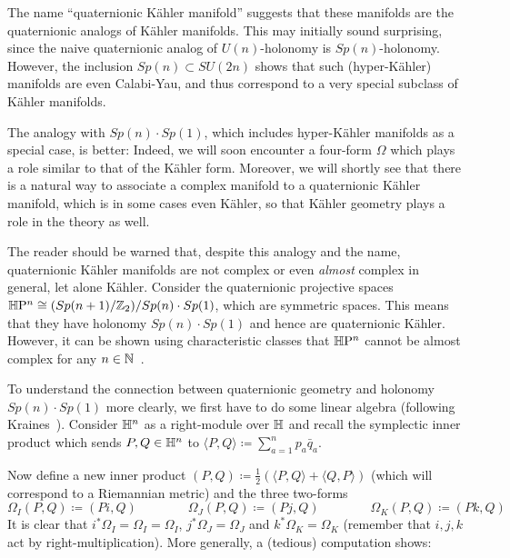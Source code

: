 \begin{rem}\leavevmode
	\begin{numberedlist}
		\item The name ``quaternionic K\"ahler manifold'' suggests that these manifolds are the quaternionic analogs of K\"ahler manifolds. This may initially sound surprising, since the naive quaternionic analog of $U(n)$-holonomy is $Sp(n)$-holonomy. However, the inclusion $Sp(n)\subset SU(2n)$ shows that such (hyper-K\"ahler) manifolds  are even Calabi-Yau, and thus correspond to a very special subclass of K\"ahler manifolds.
		
		The analogy with $Sp(n)\cdot Sp(1)$, which includes hyper-K\"ahler manifolds as a special case, is better: Indeed, we will soon encounter a four-form $\Omega$ which plays a role similar to that of the K\"ahler form. Moreover, we will shortly see that there is a natural way to associate a complex manifold to a quaternionic K\"ahler manifold, which is in some cases even K\"ahler, so that K\"ahler geometry plays a role in the theory as well.
		\item The reader should be warned that, despite this analogy and the name, quaternionic K\"ahler manifolds are not complex or even \emph{almost} complex in general, let alone K\"ahler. Consider the quaternionic projective spaces $\mathbb{H}\mathrm{P}^n\cong (Sp(n+1)/\mathbb{Z}_2)/Sp(n)\cdot Sp(1)$, which are symmetric spaces. This means that they have holonomy $Sp(n)\cdot Sp(1)$ and hence are quaternionic K\"ahler. However, it can be shown using characteristic classes that $\mathbb{H}\mathrm{P}^n$ cannot be almost complex for any $n\in\mathbb{N}$~\cite{Hir1960,Mas1962}.
	\end{numberedlist}
\end{rem}

To understand the connection between quaternionic geometry and holonomy $Sp(n)\cdot Sp(1)$ more clearly, we first have to do some linear algebra (following Kraines~\cite{Kra1966}). Consider $\mathbb{H}^n$ as a right-module over $\mathbb{H}$ and recall the symplectic inner product which sends $P, Q\in \mathbb{H}^n$ to $\langle P,Q\rangle \coloneqq \sum_{a=1}^n p_a \bar q_a$. 

Now define a new inner product $(P,Q)\coloneqq \frac{1}{2}(\langle P,Q\rangle +\langle Q,P\rangle )$ (which will correspond to a Riemannian metric) and the three two-forms 
\begin{equation*}
	\Omega_I(P,Q)\coloneqq (P i,Q) \qquad \qquad 
	\Omega_J(P,Q)\coloneqq (P j,Q) \qquad \qquad 
	\Omega_K(P,Q)\coloneqq (P k,Q)
\end{equation*}
It is clear that $i^*\Omega_I=\Omega_I=\Omega_I$, $j^*\Omega_J=\Omega_J$ and $k^*\Omega_K=\Omega_K$ (remember that $i,j,k$ act by right-multiplication). More generally, a (tedious) computation shows:

